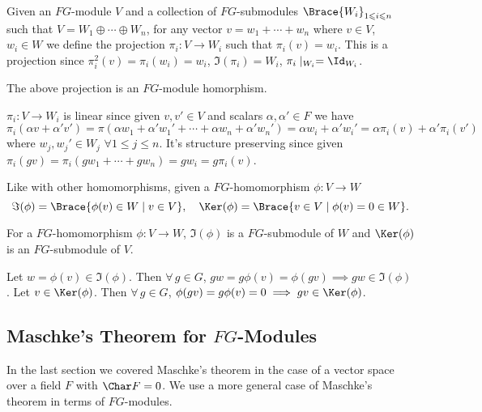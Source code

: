 \documentclass[../Project.tex]{subfiles}
\begin{document}
\begin{defi}
	Given an $FG$-module $V$ and a collection of $FG$-submodules $\Brace{W_i}_{1 \leqslant i \leqslant n}$ such that $V = W_1 \oplus \cdots \oplus W_n$, for any vector $v = w_1 + \cdots + w_n$ where $v \in V$, $w_i \in W$ we define the projection $\pi_i : V \to W_i$ such that $\pi_i(v) = w_i$. This is a projection since $\pi_i^2(v) = \pi_i(w_i) = w_i$, $\Im(\pi_i) = W_i$, $\pi_i\mid_{W_i} = \Id_{W_i}$.
\end{defi}

\begin{prop}[\cite{2}]
\label{projishom}
	The above projection is an $FG$-module homorphism.
\end{prop}
\begin{proo*}
	$\pi_i : V \to W_i$ is linear since given $v,v' \in V$ and scalars $\alpha,\alpha' \in F$ we have $\pi_i(\alpha v + \alpha'v') = \pi(\alpha w_1 + \alpha'w_1' + \cdots + \alpha w_n + \alpha'w_n') = \alpha w_i + \alpha'w_i' = \alpha \pi_i(v) + \alpha'\pi_i(v')$ where $w_j,w_j' \in W_j$ $\forall 1 \leqslant j \leqslant n$. It's structure preserving since given $\pi_i(gv) = \pi_i(gw_1+ \cdots + gw_n) = gw_i = g\pi_i(v)$.
\end{proo*}

\begin{defi}
	Like with other homomorphisms, given a $FG$-homomorphism $\phi : V \to W$
	$$\Im(\phi) = \Brace{\phi(v) \in W\;\vert\; v \in V},\quad \Ker(\phi) = \Brace{v \in V\;\vert\;\phi(v) = 0 \in W}.$$
\end{defi}

\begin{prop}
	For a $FG$-homomorphism $\phi : V \to W$, $\Im(\phi)$ is a $FG$-submodule of $W$ and $\Ker(\phi)$ is an $FG$-submodule of $V$.
\label{ImKerSub}
\end{prop}
\begin{proo*}
	Let $w = \phi(v) \in \Im(\phi)$. Then $\forall\,g \in G$, $gw = g\phi(v) = \phi(gv) \implies gw \in \Im(\phi)$. Let $v \in \Ker(\phi)$. Then $\forall\, g \in G$, $\phi(gv) = g\phi(v) = 0 \implies gv \in \Ker(\phi)$.
\end{proo*}



\newpage
\subsection{Maschke's Theorem for $FG$-Modules}
In the last section we covered Maschke's theorem in the case of a vector space over a field $F$ with $\Char F = 0$.
We use a more general case of Maschke's theorem in terms of $FG$-modules.
\end{document}
